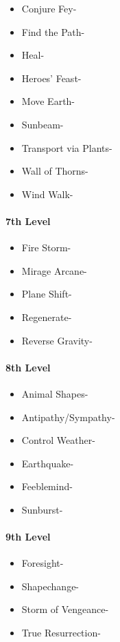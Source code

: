 \documentclass[
]{article}
\providecommand{\tightlist}{%
  \setlength{\itemsep}{0pt}\setlength{\parskip}{0pt}}
\begin{document}
\begin{itemize}
\tightlist
\item
  Conjure Fey-
\item
  Find the Path-
\item
  Heal-
\item
  Heroes' Feast-
\item
  Move Earth-
\item
  Sunbeam-
\item
  Transport via Plants-
\item
  Wall of Thorns-
\item
  Wind Walk-
\end{itemize}

\hypertarget{7th-level-2}{%
\paragraph{7th Level}\label{7th-level-2}}

\begin{itemize}
\tightlist
\item
  Fire Storm-
\item
  Mirage Arcane-
\item
  Plane Shift-
\item
  Regenerate-
\item
  Reverse Gravity-
\end{itemize}

\hypertarget{8th-level-2}{%
\paragraph{8th Level}\label{8th-level-2}}

\begin{itemize}
\tightlist
\item
  Animal Shapes-
\item
  Antipathy/Sympathy-
\item
  Control Weather-
\item
  Earthquake-
\item
  Feeblemind-
\item
  Sunburst-
\end{itemize}

\hypertarget{9th-level-2}{%
\paragraph{9th Level}\label{9th-level-2}}

\begin{itemize}
\tightlist
\item
  Foresight-
\item
  Shapechange-
\item
  Storm of Vengeance-
\item
  True Resurrection-
\end{itemize}
\end{document}

